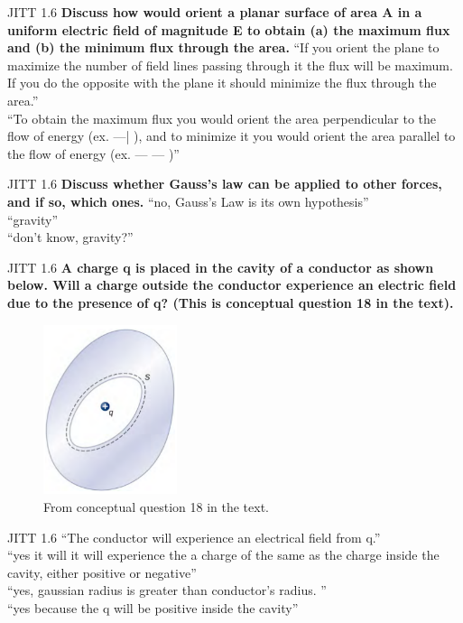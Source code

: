 \documentclass{beamer}
\begin{document}
\begin{frame}{JITT 1.6}
\small
\textbf{Discuss how would orient a planar surface of area A in a uniform electric field of magnitude E to obtain (a) the maximum flux and (b) the minimum flux through the area.}
``If you orient the plane to maximize the number of field lines passing through it the flux will be maximum. If you do the opposite with the plane it should minimize the flux through the area.'' \\
``To obtain the maximum flux you would orient the area perpendicular to the flow of energy (ex. —| ), and to minimize it you would orient the area parallel to the flow of energy (ex. — — )'' \\
\end{frame}

\begin{frame}{JITT 1.6}
\small
\textbf{Discuss whether Gauss’s law can be applied to other forces, and if so, which ones.}
``no, Gauss’s Law is its own hypothesis'' \\
``gravity'' \\
``don't know, gravity?'' \\
\end{frame}

\begin{frame}{JITT 1.6}
\small
\textbf{A charge q is placed in the cavity of a conductor as shown below. Will a charge outside the conductor experience an electric field due to the presence of q? (This is conceptual question 18 in the text).}
\begin{figure}
\centering
\includegraphics[width=0.35\textwidth]{figures/jittFigure1.png}
\caption{\label{fig:jittFigure1} From conceptual question 18 in the text.}
\end{figure}
\end{frame}

\begin{frame}{JITT 1.6}
\small
``The conductor will experience  an electrical field from q.'' \\
``yes it will it will experience the a charge of the same as the charge inside the cavity, either positive or negative'' \\
``yes, gaussian radius is greater than conductor's radius. '' \\
``yes because the q will be positive inside the cavity'' \\
\end{frame}
\end{document}
